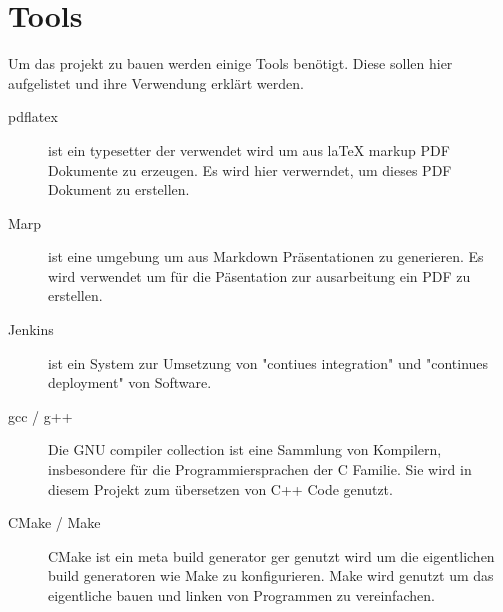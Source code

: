 \chapter{Tools}

Um das projekt zu bauen werden einige Tools benötigt. Diese sollen hier aufgelistet und ihre Verwendung erklärt werden.

\begin{description}
    \item[pdflatex] ist ein typesetter der verwendet wird um aus laTeX markup PDF Dokumente zu erzeugen. Es wird hier verwerndet, um dieses PDF Dokument zu erstellen.
    \item[Marp] ist eine  umgebung um aus Markdown Präsentationen zu generieren. Es wird verwendet um für die Päsentation zur ausarbeitung ein PDF zu erstellen.
    \item[Jenkins] ist ein System zur Umsetzung von "contiues integration" und "continues deployment" von Software.
    \item[gcc / g++] Die GNU compiler collection ist eine Sammlung von Kompilern, insbesondere für die Programmiersprachen der C Familie. Sie wird in diesem Projekt zum übersetzen von C++ Code genutzt.
    \item[CMake / Make] CMake ist ein meta build generator ger genutzt wird um die eigentlichen build generatoren wie Make zu konfigurieren. Make wird genutzt um das eigentliche bauen und linken von Programmen zu vereinfachen.
\end{description}
